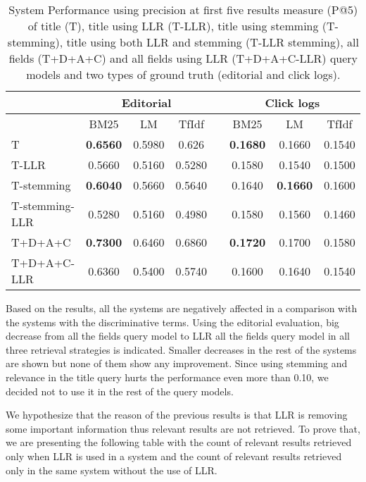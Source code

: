 \begin{table}[H]
\begin{center}
\caption{System Performance using precision at first five results measure (P@5) of title (T), title using LLR (T-LLR), title using stemming (T-stemming), title using both LLR and stemming (T-LLR stemming), all fields (T+D+A+C) and all fields using LLR (T+D+A+C-LLR) query models and two types of ground truth (editorial and click logs).}

\begin{tabular}{lccccccc}
\toprule
 & \multicolumn{3}{c}{Editorial} & & \multicolumn{3}{c}{Click logs} \\
\midrule
 & BM25 & LM & TfIdf &   & BM25 & LM & TfIdf \\
\midrule
T & \textbf{0.6560} &  0.5980 & 0.626 &   &      \textbf{0.1680} & 0.1660 & 0.1540 \\
T-LLR & 0.5660 & 0.5160 & 0.5280 &   &	 		 0.1580 & 0.1540 & 0.1500 \\
\midrule
T-stemming 	& \textbf{0.6040} & 0.5660 & 0.5640 &   &	 0.1640 & \textbf{0.1660} & 0.1600 \\
T-stemming-LLR & 0.5280 & 0.5160 & 0.4980 &   &	 0.1580 & 0.1560 & 0.1460 \\
\midrule
T+D+A+C & \textbf{0.7300} & 0.6460 & 0.6860 &   &		 \textbf{0.1720} & 0.1700 & 0.1580 \\
T+D+A+C-LLR & 0.6360 & 0.5400 & 0.5740 &   &	 0.1600 & 0.1640 & 0.1540 \\
\bottomrule
\end{tabular}
\end{center}
\end{table}


Based on the results, all the systems are negatively affected in a comparison with the systems with the discriminative terms. Using the editorial evaluation, big decrease from all the fields query model to LLR all the fields query model in all three retrieval strategies is indicated. Smaller decreases in the rest of the systems are shown but none of them show any improvement. Since using stemming and relevance in the title query hurts the performance even more than 0.10, we decided not to use it in the rest of the query models.


We hypothesize that the reason of the previous results is that LLR is removing some important information thus relevant results are not retrieved. To prove that, we are presenting the following table with the count of relevant results retrieved only when LLR is used in a system and the count of relevant results retrieved only in the same system without the use of LLR.

